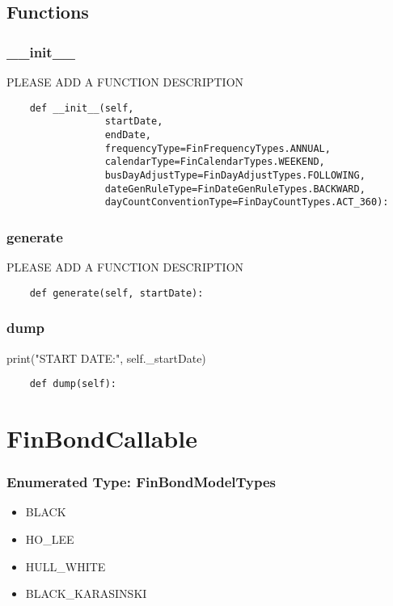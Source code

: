 \documentclass[twoside,11pt]{book}
\begin{document}
\subsection*{Functions}

\subsubsection*{{\bf \_\_init\_\_}}
PLEASE ADD A FUNCTION DESCRIPTION

\begin{lstlisting}
    def __init__(self,
                 startDate,
                 endDate,
                 frequencyType=FinFrequencyTypes.ANNUAL,
                 calendarType=FinCalendarTypes.WEEKEND,
                 busDayAdjustType=FinDayAdjustTypes.FOLLOWING,
                 dateGenRuleType=FinDateGenRuleTypes.BACKWARD,
                 dayCountConventionType=FinDayCountTypes.ACT_360):
\end{lstlisting}

\subsubsection*{{\bf generate}}
PLEASE ADD A FUNCTION DESCRIPTION

\begin{lstlisting}
    def generate(self, startDate):
\end{lstlisting}

\subsubsection*{{\bf dump}}
print("START DATE:", self.\_startDate) 

\begin{lstlisting}
    def dump(self):
\end{lstlisting}

\newpage
\section{FinBondCallable}

\subsubsection{Enumerated Type: FinBondModelTypes}
\begin{itemize}
\item{BLACK}
\item{HO\_LEE}
\item{HULL\_WHITE}
\item{BLACK\_KARASINSKI}
\end{itemize}
\end{document}
